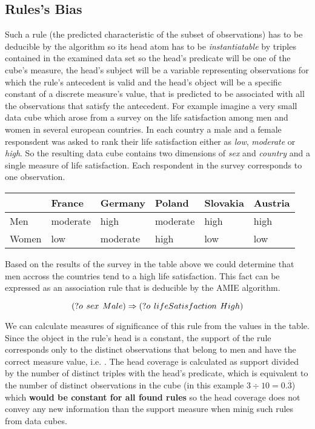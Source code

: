 \subsection{Rules's Bias}

Such a rule (the predicted characteristic of the subset of observations) has to be deducible by the algorithm so its head atom has to be \textit{instantiatable} by triples contained in the examined data set so the head's predicate will be one of the cube's measure, the head's subject will be a variable representing observations for which the rule's antecedent is valid and the head's object will be a specific constant of a discrete measure's value, that is predicted to be associated with all the observations that satisfy the antecedent. For example imagine a very small data cube which arose from a survey on the life satisfaction among men and women in several european countries. In each country a male and a female responsdent was asked to rank their life satisfaction either as \textit{low}, \textit{moderate} or \textit{high}. So the resulting data cube contains two dimensions of \textit{sex} and \textit{country} and a single measure of life satisfaction. Each respondent in the survey corresponds to one observation. 

\begin{table}[h]
\centering
\begin{tabular}{l|lllll}
    & France & Germany & Poland & Slovakia & Austria  \\ 
\hline
Men   & moderate     & high       & moderate      & high        & high        \\
Women & low      & moderate       & high      & low        & low       
\end{tabular}
\end{table}


Based on the results of the survey in the table above we could determine that men accross the countries tend to a high life satisfaction. This fact can be expressed as an association rule that is deducible by the AMIE algorithm.

$$ 
(?o\hspace{0.4em}sex\hspace{0.4em}Male) \Rightarrow (?o\hspace{0.4em}lifeSatisfaction\hspace{0.4em}High) 
$$

We can calculate measures of significance of this rule from the values in the table. Since the object in the rule's head is a constant, the support of the rule corresponds only to the distinct observations that belong to men and have the correct measure value, i.e. . The head coverage is calculated as support divided by the number of distinct triples with the head's predicate, which is equivalent to the number of distinct observations in the cube (in this example $3 \div 10 =0.\overline{3}$) which \textbf{would be constant for all found rules} so the head coverage does not convey any new information than the support measure when minig such rules from data cubes. 

